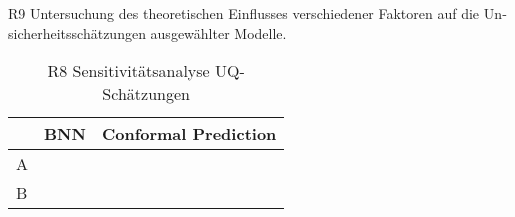 \begin{otherlanguage}{ngerman}
R9 Untersuchung des theoretischen Einflusses verschiedener Faktoren auf die Unsicherheitsschätzungen ausgewählter Modelle.



\begin{table}[htpb]
  \centering
  \begin{tabularx}{\textwidth}{|l|l|X|}
    \hline
    & \textbf{BNN} & \textbf{Conformal Prediction} \\
    \hline
    A & & \\
    \hline
    B & & \\
    \hline
  \end{tabularx}
  \caption{R8 Sensitivitätsanalyse UQ-Schätzungen}\label{tab:chapter6r91}
\end{table}




















\end{otherlanguage}
